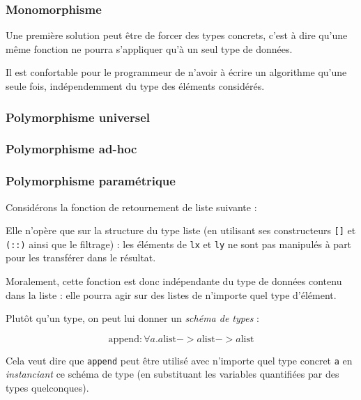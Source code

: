 \subsubsection{Monomorphisme}

Une première solution peut être de forcer des types concrets, c'est à dire
qu'une même fonction ne pourra s'appliquer qu'à un seul type de données.

Il est confortable pour le programmeur de n'avoir à écrire un algorithme qu'une
seule fois, indépendemment du type des éléments considérés.

\subsubsection{Polymorphisme universel}


\subsubsection{Polymorphisme ad-hoc}


\subsubsection{Polymorphisme paramétrique}

Considérons la fonction de retournement de liste suivante :


Elle n'opère que sur la structure du type liste (en utilisant ses constructeurs
\texttt{{[}{]}} et \texttt{(::)} ainsi que le filtrage) : les éléments de
\texttt{lx} et \texttt{ly} ne sont pas manipulés à part pour les transférer dans
le résultat.

Moralement, cette fonction est donc indépendante du type de données contenu dans
la liste : elle pourra agir sur des listes de n'importe quel type d'élément.

Plutôt qu'un type, on peut lui donner un \emph{schéma de types} :

\[
  \textrm{append} : \forall a . a \textrm{list}
                             -> a \textrm{list}
                             -> a \textrm{list}
\]

Cela veut dire que \texttt{append} peut être utilisé avec n'importe quel type
concret \texttt{a} en \emph{instanciant} ce schéma de type (en substituant les
variables quantifiées par des types quelconques).


